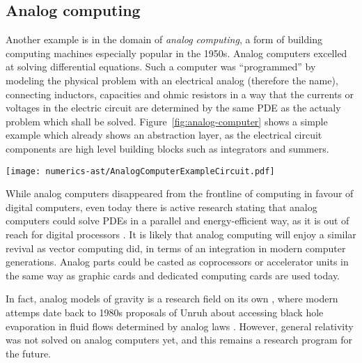 \subsection{Analog computing}
%
Another example is in the domain of \emph{analog computing}, a form of building
computing machines especially popular in the 1950s.
Analog computers excelled at solving differential equations. Such a computer
was ``programmed'' by modeling the physical problem with an electrical
analog (therefore the name), \ie connecting inductors, capacities and ohmic
resistors in a way that the currents or voltages in the electric circuit are
determined by the same PDE as the actualy problem which shall be solved.
Figure~\ref{fig:analog-computer} shows a simple example which already shows
an abstraction layer, as the electrical circuit components are high level
building blocks such as integrators and summers.

\begin{marginfigure}
	\texttt{[image: numerics-ast/AnalogComputerExampleCircuit.pdf]}
	\caption[Sketch of a simple analog computing problem.
	]%
	{Sketch of a damped oscillation as a toy problem from classical mechanics,
		described by the ODE IVP $\ddot x = -0.2 \dot x - 0.5 x + 1$ with ID $x(0), \dot x(0)$.
		The lower panel shows the electrical circuit to solve the \emph{analogue} problem.
		Adopted from \cite{AnalogNingPhd}.}\label{fig:analog-computer}
\end{marginfigure}
While analog computers disappeared from the frontline of computing in favour
of digital computers, even today there is active research stating that analog
computers could solve PDEs in a parallel and energy-efficient way, as it is
out of reach for digital processors \cite{ulmann2013analog}.
It is likely that analog computing will enjoy a similar revival as vector
computing did, in terms of an integration in modern computer generations.
Analog parts could be casted as coprocessors or accelerator
units in the same way as graphic cards and dedicated computing cards are
used today.

In fact, analog models of gravity is a research field on its own
\cite{Barcelo2011,Balbinot:2006ua}, where modern attemps date back to 1980s
proposals of Unruh about accessing black hole evaporation in fluid flows
determined by analog laws \cite{Unruh81}. However, general relativity was not 
solved on analog computers yet, and this remains a research program for the
future.


